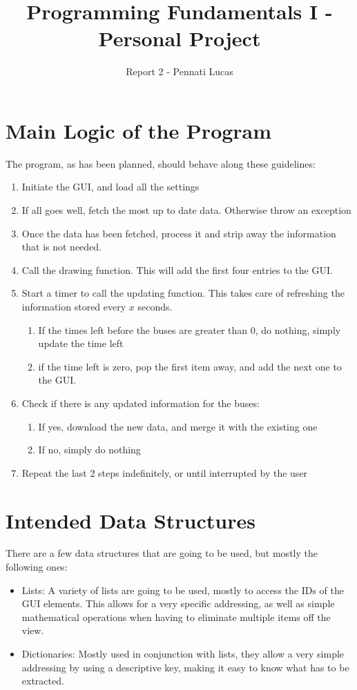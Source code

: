 \documentclass[a4paper]{article}
\title{Programming Fundamentals I - Personal Project}
\author{Report 2 - Pennati Lucas}
\begin{document}
\maketitle
\section{Main Logic of the Program}
The program, as has been planned, should behave along these guidelines:
\begin{enumerate}
\item Initiate the GUI, and load all the settings
\item If all goes well, fetch the most up to date data. Otherwise throw an exception
\item Once the data has been fetched, process it and strip away the information that is not needed. 
\item Call the drawing function. This will add the first four entries to the GUI.
\item Start a timer to call the updating function. This takes care of refreshing the information stored every $x$ seconds.
\begin{enumerate}
\item If the times left before the buses are greater than 0, do nothing, simply update the time left
\item if the time left is zero, pop the first item away, and add the next one to the GUI. 
\end{enumerate}
\item Check if there is any updated information for the buses:
\begin{enumerate}
\item If yes, download the new data, and merge it with the existing one
\item If no, simply do nothing
\end{enumerate}
\item Repeat the last 2 steps indefinitely, or until interrupted by the user
\end{enumerate}
\section{Intended Data Structures}
There are a few data structures that are going to be used, but mostly the following ones:
\begin{itemize}
\item Lists: A variety of lists are going to be used, mostly to access the IDs of the GUI elements. This allows for a very specific addressing, as well as simple mathematical operations when having to eliminate multiple items off the view.
\item Dictionaries: Mostly used in conjunction with lists, they allow a very simple addressing by using a descriptive key, making it easy to know what has to be extracted. 
\end{itemize}
\end{document}
